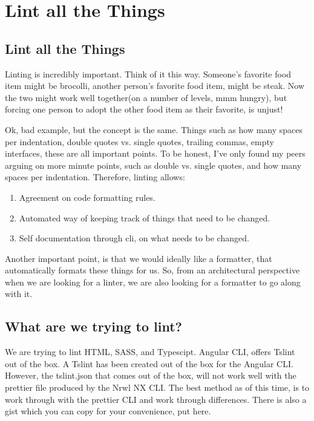 
\chapter{ Lint all the Things }

\section{ Lint all the Things }

Linting is incredibly important. Think of it this way. Someone's favorite food
item might be brocolli, another person's favorite food item, might be steak.
Now the two might work well together(on a number of levels, mmm hungry), but
forcing one person to adopt the other food item as their favorite, is unjust!

Ok, bad example, but the concept is the same. Things such as how many spaces per
indentation, double quotes vs. single quotes, trailing commas, empty interfaces,
these are all important points. To be honest, I've only found my peers arguing
on more minute points, such as double vs. single quotes, and how many spaces
per indentation. Therefore, linting allows:
\begin{enumerate}
  \item Agreement on code formatting rules.
  \item Automated way of keeping track of things that need to be changed.
  \item Self documentation through cli, on what needs to be changed.
\end{enumerate}

Another important point, is that we would ideally like a formatter, that
automatically formats these things for us. So, from an architectural perspective
when we are looking for a linter, we are also looking for a formatter to go along
with it.

\section{ What are we trying to lint? }
We are trying to lint HTML, SASS, and Typescipt. Angular CLI, offers Tslint out
of the box. A Tslint has been created out of the box for the Angular CLI.
However, the tslint.json that comes out of the box, will not work well with the
prettier file produced by the Nrwl NX CLI. The best method as of this time, is to
work through with the prettier CLI and work through differences. There is also
a gist which you can copy for your convenience, put here.

